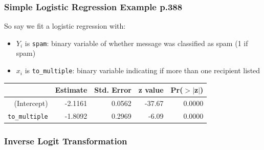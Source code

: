 \documentclass[handout]{beamer}
\newcommand{\blue}[1]{\textcolor{blue2}{#1}}
\begin{document}
\begin{frame}[fragile]
\frametitle{Simple Logistic Regression Example p.388}

So say we fit a logistic regression with:
\begin{itemize}
\item $Y_i$ is {\tt spam}:  binary variable of whether message was classified as spam (1 if spam)
\pause\item $x_i$ is {\tt to\_multiple}:  binary variable indicating if more than one recipient listed
\end{itemize}
\pause
\begin{table}[ht]
\centering
\begin{tabular}{r|rrrr}
  \hline
 & Estimate & Std. Error & z value & Pr($>$$|$z$|$) \\ 
  \hline
(Intercept) & -2.1161 & 0.0562 & -37.67 & 0.0000 \\ 
  {\tt to\_multiple} & -1.8092 & 0.2969 & -6.09 & 0.0000 \\ 
   \hline
\end{tabular}
\end{table}

%
%

\end{frame}


\begin{frame}[fragile]
\frametitle{Inverse Logit Transformation}
%
%
%
%


\end{frame}
\end{document}
